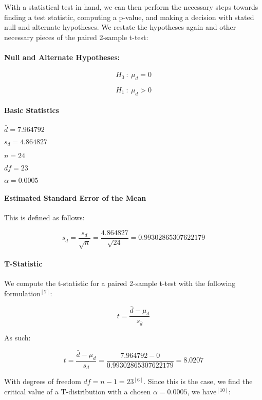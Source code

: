 \documentclass[11pt]{article}
\begin{document}
    With a statistical test in hand, we can then perform the necessary steps
towards finding a test statistic, computing a p-value, and making a
decision with stated null and alternate hypotheses. We restate the
hypotheses again and other necessary pieces of the paired 2-sample
t-test:

\hypertarget{null-and-alternate-hypotheses}{%
\paragraph{Null and Alternate
Hypotheses:}\label{null-and-alternate-hypotheses}}

\[H_{0} \: : \: \mu_d = 0\]

\[H_{1} \: : \: \mu_d > 0\]

\hypertarget{basic-statistics}{%
\paragraph{Basic Statistics}\label{basic-statistics}}

\(\bar{d} = 7.964792\)

\(s_{d} = 4.864827\)

\(n = 24\)

\(df = 23\)

\(\alpha = 0.0005\)

\hypertarget{estimated-standard-error-of-the-mean}{%
\paragraph{Estimated Standard Error of the
Mean}\label{estimated-standard-error-of-the-mean}}

This is defined as follows:

\[s_{\bar{d}} = \frac{s_d}{\sqrt{n}} = \frac{4.864827}{\sqrt{24}} = 0.99302865307622179\]

\hypertarget{t-statistic}{%
\paragraph{T-Statistic}\label{t-statistic}}

We compute the t-statistic for a paired 2-sample t-test with the
following formulation\(^{[7]}\):

\[t = \frac{\bar{d} - \mu_d}{s_{\bar{d}}}\]

As such:

\[t = \frac{\bar{d} - \mu_d}{s_d} = \frac{7.964792 - 0}{0.99302865307622179} = 8.0207\]

With degrees of freedom \(df = n - 1 = 23\)\(^{[6]}\). Since this is the
case, we find the critical value of a T-distribution with a chosen
\(\alpha = 0.0005\), we have\(^{[10]}\):
\end{document}
